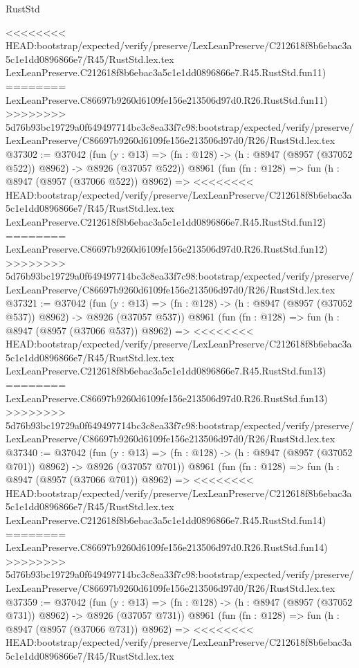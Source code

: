 \begin{lexlean}{RustStd}
\begin{coremodule}
{\begin{coremodule}
{{{{{{{{{{{{{{{{{{{{{{{{{{{{{{{{{{{{{{{<<<<<<<< HEAD:bootstrap/expected/verify/preserve/LexLeanPreserve/C212618f8b6ebac3a5c1e1dd0896866e7/R45/RustStd.lex.tex
    LexLeanPreserve.C212618f8b6ebac3a5c1e1dd0896866e7.R45.RustStd.fun11)
========
    LexLeanPreserve.C86697b9260d6109fe156e213506d97d0.R26.RustStd.fun11)
>>>>>>>> 5d76b93bc19729a0f649497714bc3c8ea33f7c98:bootstrap/expected/verify/preserve/LexLeanPreserve/C86697b9260d6109fe156e213506d97d0/R26/RustStd.lex.tex
@37302 := @37042
    (fun (y : @13) => (fn : @128) -> (h : @8947 (@8957 (@37052 @522)) @8962) -> @8926 (@37057 @522))
    @8961
    (fun (fn : @128) =>
    fun (h : @8947 (@8957 (@37066 @522)) @8962) =>
<<<<<<<< HEAD:bootstrap/expected/verify/preserve/LexLeanPreserve/C212618f8b6ebac3a5c1e1dd0896866e7/R45/RustStd.lex.tex
    LexLeanPreserve.C212618f8b6ebac3a5c1e1dd0896866e7.R45.RustStd.fun12)
========
    LexLeanPreserve.C86697b9260d6109fe156e213506d97d0.R26.RustStd.fun12)
>>>>>>>> 5d76b93bc19729a0f649497714bc3c8ea33f7c98:bootstrap/expected/verify/preserve/LexLeanPreserve/C86697b9260d6109fe156e213506d97d0/R26/RustStd.lex.tex
@37321 := @37042
    (fun (y : @13) => (fn : @128) -> (h : @8947 (@8957 (@37052 @537)) @8962) -> @8926 (@37057 @537))
    @8961
    (fun (fn : @128) =>
    fun (h : @8947 (@8957 (@37066 @537)) @8962) =>
<<<<<<<< HEAD:bootstrap/expected/verify/preserve/LexLeanPreserve/C212618f8b6ebac3a5c1e1dd0896866e7/R45/RustStd.lex.tex
    LexLeanPreserve.C212618f8b6ebac3a5c1e1dd0896866e7.R45.RustStd.fun13)
========
    LexLeanPreserve.C86697b9260d6109fe156e213506d97d0.R26.RustStd.fun13)
>>>>>>>> 5d76b93bc19729a0f649497714bc3c8ea33f7c98:bootstrap/expected/verify/preserve/LexLeanPreserve/C86697b9260d6109fe156e213506d97d0/R26/RustStd.lex.tex
@37340 := @37042
    (fun (y : @13) => (fn : @128) -> (h : @8947 (@8957 (@37052 @701)) @8962) -> @8926 (@37057 @701))
    @8961
    (fun (fn : @128) =>
    fun (h : @8947 (@8957 (@37066 @701)) @8962) =>
<<<<<<<< HEAD:bootstrap/expected/verify/preserve/LexLeanPreserve/C212618f8b6ebac3a5c1e1dd0896866e7/R45/RustStd.lex.tex
    LexLeanPreserve.C212618f8b6ebac3a5c1e1dd0896866e7.R45.RustStd.fun14)
========
    LexLeanPreserve.C86697b9260d6109fe156e213506d97d0.R26.RustStd.fun14)
>>>>>>>> 5d76b93bc19729a0f649497714bc3c8ea33f7c98:bootstrap/expected/verify/preserve/LexLeanPreserve/C86697b9260d6109fe156e213506d97d0/R26/RustStd.lex.tex
@37359 := @37042
    (fun (y : @13) => (fn : @128) -> (h : @8947 (@8957 (@37052 @731)) @8962) -> @8926 (@37057 @731))
    @8961
    (fun (fn : @128) =>
    fun (h : @8947 (@8957 (@37066 @731)) @8962) =>
<<<<<<<< HEAD:bootstrap/expected/verify/preserve/LexLeanPreserve/C212618f8b6ebac3a5c1e1dd0896866e7/R45/RustStd.lex.tex
}}}}}}}}}}}}}}}}}}}}}}}}}}}}}}}}}}}}}}}
\end{coremodule}}
\end{coremodule}
\end{lexlean}
